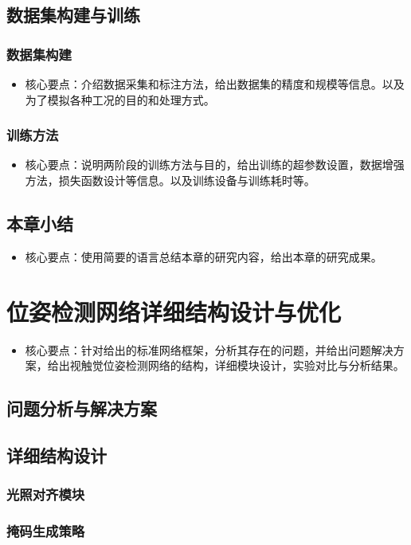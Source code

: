 \documentclass{Diploma}
\begin{document}
\begin{}
\section{数据集构建与训练}
\subsection{数据集构建}
\begin{itemize}
  \item 核心要点：介绍数据采集和标注方法，给出数据集的精度和规模等信息。以及为了模拟各种工况的目的和处理方式。
\end{itemize}
\subsection{训练方法}
\begin{itemize}
  \item 核心要点：说明两阶段的训练方法与目的，给出训练的超参数设置，数据增强方法，损失函数设计等信息。以及训练设备与训练耗时等。
\end{itemize}
\section{本章小结}
\begin{itemize}
  \item 核心要点：使用简要的语言总结本章的研究内容，给出本章的研究成果。
\end{itemize}
\chapter{位姿检测网络详细结构设计与优化}
\begin{itemize}
  \item 核心要点：针对给出的标准网络框架，分析其存在的问题，并给出问题解决方案，给出视触觉位姿检测网络的结构，详细模块设计，实验对比与分析结果。
\end{itemize}
\section{问题分析与解决方案}
\section{详细结构设计}
\subsection{光照对齐模块}
\subsection{掩码生成策略}

\end{}
\end{document}
